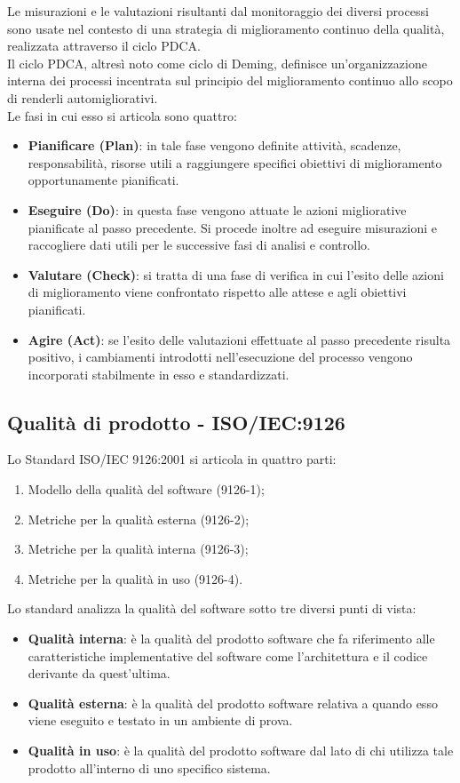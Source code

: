 Le misurazioni e le valutazioni risultanti dal monitoraggio dei diversi processi sono usate nel contesto di una strategia di miglioramento continuo della qualità, realizzata attraverso il ciclo PDCA.
\\Il ciclo PDCA, altresì noto come ciclo di Deming, definisce un'organizzazione interna dei processi incentrata sul principio del miglioramento continuo allo scopo di renderli automigliorativi.
\\Le fasi in cui esso si articola sono quattro:
	\begin{itemize}
		\item \textbf{Pianificare (Plan)}: in tale fase vengono definite attività, scadenze, responsabilità, risorse utili a raggiungere specifici obiettivi di miglioramento opportunamente pianificati.
		\item \textbf{Eseguire (Do)}: in questa fase vengono attuate le azioni migliorative pianificate al passo precedente. Si procede inoltre ad eseguire misurazioni e raccogliere dati utili per le successive fasi di analisi e controllo.
		\item \textbf{Valutare (Check)}: si tratta di una fase di verifica in cui l'esito delle azioni di miglioramento viene confrontato rispetto alle attese e agli obiettivi pianificati.
		\item \textbf{Agire (Act)}: se l'esito delle valutazioni effettuate al passo precedente risulta positivo, i cambiamenti introdotti nell'esecuzione del processo vengono incorporati stabilmente in esso e standardizzati.
	\end{itemize}
	\subsection{Qualità di prodotto - ISO/IEC:9126}
	Lo Standard ISO/IEC 9126:2001 si articola in quattro parti:
	\begin{enumerate}
	\item Modello della qualità del software (9126-1);
		\item Metriche per la qualità esterna (9126-2);
		\item Metriche per la qualità interna (9126-3);
		\item Metriche per la qualità in uso (9126-4).
	\end{enumerate}
	Lo standard analizza la qualità del software sotto tre diversi punti di vista:
	\begin{itemize}
		\item \textbf{Qualità interna}: è la qualità del prodotto software che fa riferimento alle caratteristiche implementative del software come l'architettura e il codice derivante da quest'ultima.
		\item \textbf{Qualità esterna}: è la qualità del prodotto software relativa a quando esso viene eseguito e testato in un ambiente di prova. 
		\item \textbf{Qualità in uso}: è la qualità del prodotto software dal lato di chi utilizza tale prodotto all'interno di uno specifico sistema.
	\end{itemize}
